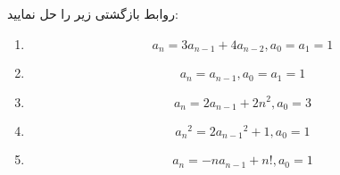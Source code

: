     \p 
روابط بازگشتی زیر را حل نمایید:
\begin{enumerate}
\item
$$a_n = 3a_{n-1} + 4a_{n-2}, a_0 = a_1 = 1$$
\item
$$a_n = a_{n-1}, a_0 = a_1 = 1$$
\item
$$a_n = 2a_{n-1} + 2n^2, a_0 = 3$$
\item
$${a_n}^2 = 2{a_{n-1}}^2 + 1, a_0 = 1$$
\item
$$a_n = -na_{n-1} + n!, a_0 = 1$$
\end{enumerate}